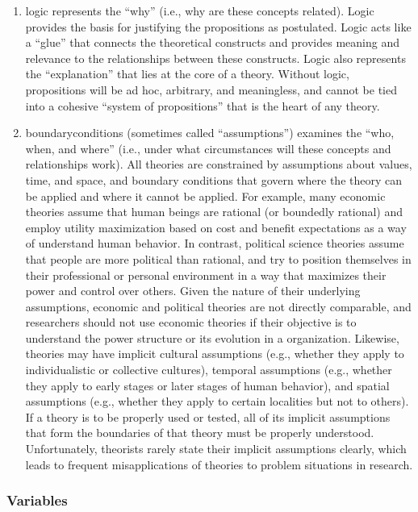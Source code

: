 \begin{enumerate}
	\item \Gls{logic} represents the ``why'' (i.e., why are these concepts related). Logic provides the basis for justifying the propositions as postulated. Logic acts like a ``glue'' that connects the theoretical constructs and provides meaning and relevance to the relationships between these constructs. Logic also represents the ``explanation'' that lies at the core of a theory. Without logic, propositions will be ad hoc, arbitrary, and meaningless, and cannot be tied into a cohesive ``system of propositions'' that is the heart of any theory.

	\item \Glspl{boundarycondition} (sometimes called ``assumptions'') examines the ``who, when, and where'' (i.e., under what circumstances will these concepts and relationships work). All theories are constrained by assumptions about values, time, and space, and boundary conditions that govern where the theory can be applied and where it cannot be applied. For example, many economic theories assume that human beings are rational (or boundedly rational) and employ utility maximization based on cost and benefit expectations as a way of understand human behavior. In contrast, political science theories assume that people are more political than rational, and try to position themselves in their professional or personal environment in a way that maximizes their power and control over others. Given the nature of their underlying assumptions, economic and political theories are not directly comparable, and researchers should not use economic theories if their objective is to understand the power structure or its evolution in a organization. Likewise, theories may have implicit cultural assumptions (e.g., whether they apply to individualistic or collective cultures), temporal assumptions (e.g., whether they apply to early stages or later stages of human behavior), and spatial assumptions (e.g., whether they apply to certain localities but not to others). If a theory is to be properly used or tested, all of its implicit assumptions that form the boundaries of that theory must be properly understood. Unfortunately, theorists rarely state their implicit assumptions clearly, which leads to frequent misapplications of theories to problem situations in research.
\end{enumerate}

\subsubsection{Variables}

